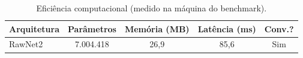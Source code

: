 \begin{table}[H]
\centering
\caption{Eficiência computacional (medido na máquina do benchmark).}
\label{tab:bench_eficiencia}
\small\singlespacing
\begin{tabular}{lcccc}
\toprule
\textbf{Arquitetura} & \textbf{Parâmetros} & \textbf{Memória (MB)} & \textbf{Latência (ms)} & \textbf{Conv.?} \\
\midrule
RawNet2 & 7.004.418 & 26,9 & 85,6 & \textcolor{successgreen}{Sim} \\
\bottomrule
\end{tabular}
\end{table}
